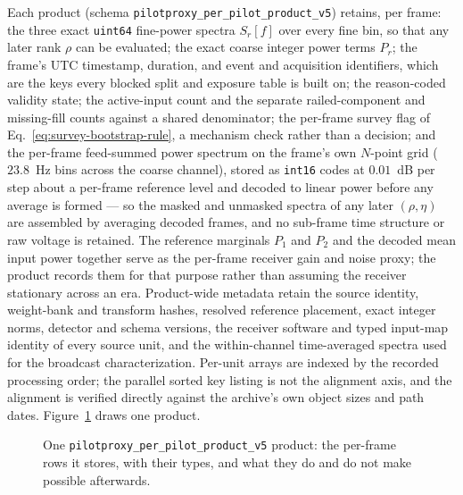 Each product (schema \texttt{pilotproxy\_per\_pilot\_product\_v5}) retains, per
frame: the three exact \texttt{uint64} fine-power spectra $S_r[f]$ over every
fine bin, so that any later rank $\rho$ can be evaluated; the exact coarse
integer power terms $P_r$; the frame's UTC timestamp, duration, and event and
acquisition identifiers, which are the keys every blocked split and exposure
table is built on; the reason-coded validity state; the active-input count and
the separate railed-component and missing-fill counts against a shared
denominator; the per-frame survey flag of
Eq.~\eqref{eq:survey-bootstrap-rule}, a mechanism check rather than a decision; and the per-frame feed-summed power spectrum on the frame's own $N$-point
grid ($23.8$~Hz bins across the coarse channel), stored as \texttt{int16}
codes at $0.01$~dB per step about a per-frame reference level and decoded to
linear power before any average is formed --- so the masked and unmasked
spectra of any later $(\rho,\eta)$ are assembled by averaging decoded frames,
and no sub-frame time structure or raw voltage is retained.  The reference
marginals $P_1$ and $P_2$ and the decoded mean input power together serve as
the per-frame receiver gain and noise proxy; the product records them for that
purpose rather than assuming the receiver stationary across an era.  Product-wide metadata retain
the source identity, weight-bank and transform hashes, resolved reference
placement, exact integer norms, detector and schema versions, the receiver
software and typed input-map identity of every source unit, and the
within-channel time-averaged spectra used for the broadcast characterization.
Per-unit arrays are indexed by the recorded processing order; the parallel
sorted key listing is not the alignment axis, and the alignment is verified
directly against the archive's own object sizes and path dates.
Figure~\ref{fig:survey:product} draws one product.

\begin{figure}[t]
\centering
\resizebox{\linewidth}{!}{}
\caption[One v5 product]{One \texttt{pilotproxy\_per\_pilot\_product\_v5} product: the per-frame rows it stores, with their types, and what they do and do not make possible afterwards.}
\label{fig:survey:product}
\end{figure}

